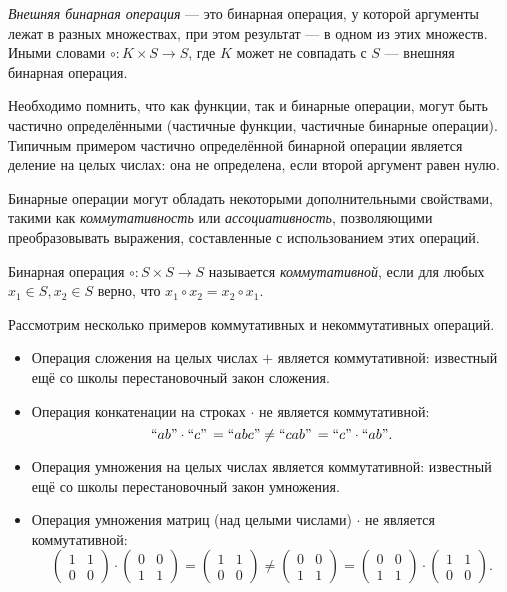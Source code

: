 \begin{definition}
\emph{Внешняя бинарная операция} --- это бинарная операция, у которой аргументы лежат в разных множествах, при этом результат --- в одном из этих множеств. Иными словами $\circ: K \times S \to S$, где $K$ может не совпадать с $S$  --- внешняя бинарная операция.
\end{definition}


Необходимо помнить, что как функции, так и бинарные операции, могут быть частично определёнными (частичные функции, частичные бинарные операции). Типичным примером частично определённой бинарной операции является деление на целых числах: она не определена, если второй аргумент равен нулю.


Бинарные операции могут обладать некоторыми дополнительными свойствами, такими как \textit{коммутативность} или \textit{ассоциативность}, позволяющими преобразовывать выражения, составленные с использованием этих операций.


\begin{definition}
Бинарная операция $\circ : S \times S \to S$ называется \emph{коммутативной}, если для любых  $x_1 \in S, x_2 \in S$ верно, что  $x_1 \circ x_2 = x_2 \circ x_1$.
\end{definition}

\begin{example} Рассмотрим несколько примеров коммутативных и некоммутативных операций.
	\begin{itemize}
		\item Операция сложения на целых числах $+$ является коммутативной: известный ещё со школы перестановочный закон сложения.
		\item Операция конкатенации на строках $\cdot$ не является коммутативной: $$``ab" \cdot ``c" \, = ``abc" \neq ``cab" \, = ``c" \cdot ``ab".$$
		\item Операция умножения на целых числах является коммутативной: известный ещё со школы перестановочный закон умножения.
		\item Операция умножения матриц (над целыми числами) $\cdot$ не является коммутативной:
		$$\begin{pmatrix}
		1 & 1 \\ 0 & 0
		\end{pmatrix}
		\cdot
		\begin{pmatrix}
		0 & 0 \\ 1 & 1
		\end{pmatrix}
		=
		\begin{pmatrix}
		1 & 1 \\ 0 & 0
		\end{pmatrix}
		\neq
		\begin{pmatrix}
			0 & 0 \\ 1 & 1
		\end{pmatrix}
		=
		\begin{pmatrix}
		0 & 0 \\ 1 & 1
		\end{pmatrix}
		\cdot
		\begin{pmatrix}
		1 & 1 \\ 0 & 0
		\end{pmatrix}
		.$$
	\end{itemize}
\end{example}

